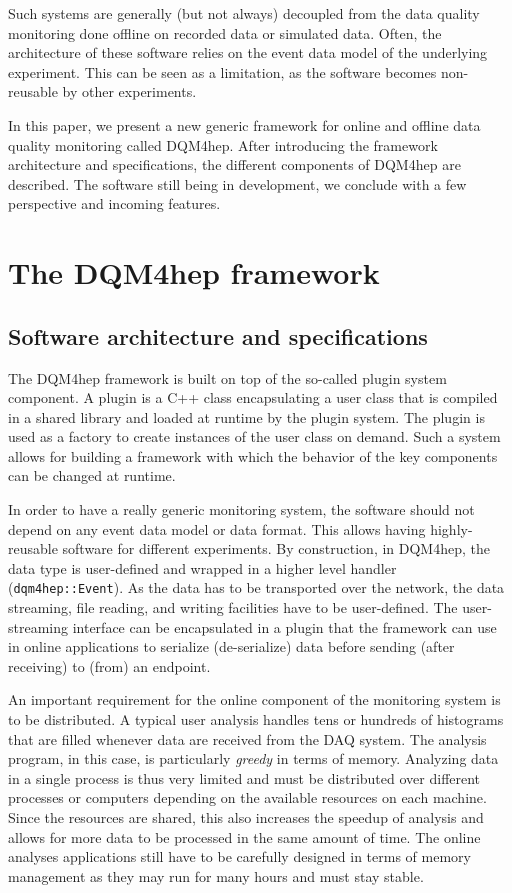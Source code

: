 \documentclass{webofc}
\begin{document}
Such systems are generally (but not always) decoupled from the data quality monitoring done offline on recorded data or simulated data.
Often, the architecture of these software relies on the event data model of the underlying experiment. This can be seen as a limitation, as the software becomes non-reusable by other experiments.

In this paper, we present a new generic framework for online and offline data quality monitoring called DQM4hep.
After introducing the framework architecture and specifications, the different components of DQM4hep are described.
The software still being in development, we conclude with a few perspective and incoming features.

\section{The DQM4hep framework}
\label{sec:framework}

\subsection{Software architecture and specifications}
\label{subsec:arch}

The DQM4hep framework is built on top of the so-called plugin system component.
A plugin is a C++ class encapsulating a user class that is compiled in a shared library and loaded at runtime by the plugin system.
The plugin is used as a factory to create instances of the user class on demand.
Such a system allows for building a framework with which the behavior of the key components can be changed at runtime.

In order to have a really generic monitoring system, the software should not depend on any event data model or data format.
This allows having highly-reusable software for different experiments.
By construction, in DQM4hep, the data type is user-defined and wrapped in a higher level handler (\texttt{dqm4hep::Event}).
As the data has to be transported over the network, the data streaming, file reading, and writing facilities have to be user-defined.
The user-streaming interface can be encapsulated in a plugin that the framework can use in online applications to serialize (de-serialize) data before sending (after receiving) to (from) an endpoint.

An important requirement for the online component of the monitoring system is to be distributed.
A typical user analysis handles tens or hundreds of histograms that are filled whenever data are received from the DAQ system.
The analysis program, in this case, is particularly \textit{greedy} in terms of memory.
Analyzing data in a single process is thus very limited and must be distributed over different processes or computers depending on the available resources on each machine.
Since the resources are shared, this also increases the speedup of analysis and allows for more data to be processed in the same amount of time.
The online analyses applications still have to be carefully designed in terms of memory management as they may run for many hours and must stay stable.
\end{document}
